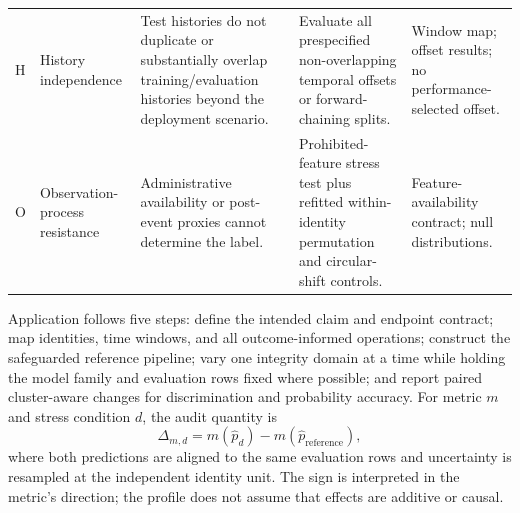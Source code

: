 \begin{table}[H]
\begin{tabular}{L{1.1cm} L{2.8cm} L{4.1cm} L{4.0cm} L{3.2cm}}
H & History independence & Test histories do not duplicate or substantially overlap training/evaluation histories beyond the deployment scenario. & Evaluate all prespecified non-overlapping temporal offsets or forward-chaining splits. & Window map; offset results; no performance-selected offset. \\
O & Observation-process resistance & Administrative availability or post-event proxies cannot determine the label. & Prohibited-feature stress test plus refitted within-identity permutation and circular-shift controls. & Feature-availability contract; null distributions. \\
\bottomrule
\end{tabular}
\end{table}

Application follows five steps: define the intended claim and endpoint contract;
map identities, time windows, and all outcome-informed operations; construct the
safeguarded reference pipeline; vary one integrity domain at a time while
holding the model family and evaluation rows fixed where possible; and report
paired cluster-aware changes for discrimination and probability accuracy. For
metric $m$ and stress condition $d$, the audit quantity is
\begin{equation}
\Delta_{m,d}=m(\widehat{p}_{d})-m(\widehat{p}_{\mathrm{reference}}),
\end{equation}
where both predictions are aligned to the same evaluation rows and uncertainty
is resampled at the independent identity unit. The sign is interpreted in the
metric's direction; the profile does not assume that effects are additive or causal.
